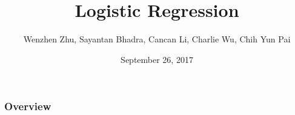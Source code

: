 \documentclass{beamer}
\title[Logistic Regression]{Logistic Regression} %
\author{Wenzhen Zhu, Sayantan Bhadra, Cancan Li, Charlie Wu, Chih Yun Pai} %
\institute[WUSTL] %
{
Washington University in St. Louis \\ %
\medskip
\textit{CSE 543T Algorithms for Nonlinear Optimization} %
}
\date{September 26, 2017} %
\begin{document}
\begin{frame}
\titlepage %
\end{frame}

\begin{frame}
\frametitle{Overview} %
\tableofcontents %
\end{frame}







\end{document}
